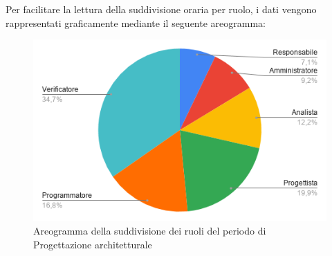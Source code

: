 \documentclass[../piano-di-progetto.tex]{subfiles}
\begin{document}
  Per facilitare la lettura della suddivisione oraria per ruolo, i dati vengono rappresentati graficamente mediante il seguente areogramma:
  \begin{figure}[H]
    \centering
    \includegraphics[width=12cm]{img/ruoli-progettazione.png}
    \caption{Areogramma della suddivisione dei ruoli del periodo di Progettazione architetturale}
    \label{fig:ore-ruolo-progettazione}
  \end{figure}
\end{document}
